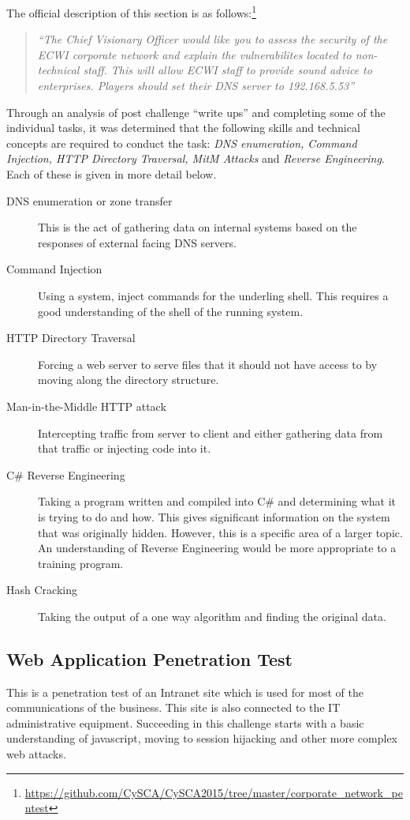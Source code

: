 \documentclass[a4paper,11pt]{report}
\begin{document}
			The official description of this section is as follows:\footnote{\url{https://github.com/CySCA/CySCA2015/tree/master/corporate\_network\_pentest}}
			\begin{quote}
				\textit{``The Chief Visionary Officer would like you to assess the security of the ECWI corporate network and explain the vulnerabilites located to non-technical staff. This will allow ECWI staff to provide sound advice to enterprises. Players should set their DNS server to 192.168.5.53''}
			\end{quote}

			Through an analysis of post challenge ``write ups'' and completing some of the individual tasks, 
			it was determined that the following skills and technical concepts are required to conduct the task: 
			\textit{DNS enumeration, Command Injection, HTTP Directory Traversal, MitM Attacks} and \textit{Reverse Engineering}. 
			Each of these is given in more detail below. 
			\begin{description}
				\item[DNS enumeration or zone transfer]
					This is the act of gathering data on internal systems based on the responses of external facing DNS servers. 
				\item[Command Injection]
					Using a system, inject commands for the underling shell. 
					This requires a good understanding of the shell of the running system. 
				\item[HTTP Directory Traversal]
					Forcing a web server to serve files that it should not have access to by moving along the directory structure.
				\item[Man-in-the-Middle HTTP attack]
					Intercepting traffic from server to client and either gathering data from that traffic or injecting code into it. 
				\item[C\# Reverse Engineering]
					Taking a program written and compiled into C\# and determining what it is trying to do and how. 
					This gives significant information on the system that was originally hidden. 
					However, this is a specific area of a larger topic. 
					An understanding of Reverse Engineering would be more appropriate to a training program. 
				\item[Hash Cracking]
					Taking the output of a one way algorithm and finding the original data. 
			\end{description}
		\subsection{Web Application Penetration Test}
			This is a penetration test of an Intranet site which is used for most of the communications of the business. 
			This site is also connected to the IT administrative equipment. 
			Succeeding in this challenge starts with a basic understanding of javascript, moving to session hijacking and other more complex web attacks. 
			
\end{document}
